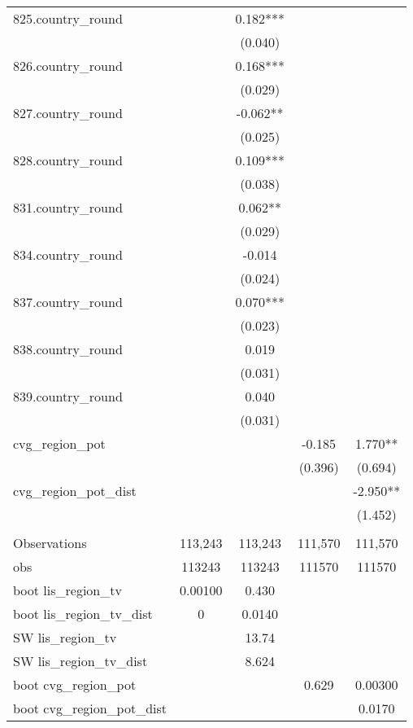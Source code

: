 \documentclass[]{article}
\begin{document}
\begin{tabular}{lcccc}
825.country\_round &  & 0.182*** &  &  \\
 &  & (0.040) &  &  \\
826.country\_round &  & 0.168*** &  &  \\
 &  & (0.029) &  &  \\
827.country\_round &  & -0.062** &  &  \\
 &  & (0.025) &  &  \\
828.country\_round &  & 0.109*** &  &  \\
 &  & (0.038) &  &  \\
831.country\_round &  & 0.062** &  &  \\
 &  & (0.029) &  &  \\
834.country\_round &  & -0.014 &  &  \\
 &  & (0.024) &  &  \\
837.country\_round &  & 0.070*** &  &  \\
 &  & (0.023) &  &  \\
838.country\_round &  & 0.019 &  &  \\
 &  & (0.031) &  &  \\
839.country\_round &  & 0.040 &  &  \\
 &  & (0.031) &  &  \\
cvg\_region\_pot &  &  & -0.185 & 1.770** \\
 &  &  & (0.396) & (0.694) \\
cvg\_region\_pot\_dist &  &  &  & -2.950** \\
 &  &  &  & (1.452) \\
 &  &  &  &  \\
Observations & 113,243 & 113,243 & 111,570 & 111,570 \\
obs & 113243 & 113243 & 111570 & 111570 \\
boot lis\_region\_tv & 0.00100 & 0.430 &  &  \\
boot lis\_region\_tv\_dist & 0 & 0.0140 &  &  \\
SW lis\_region\_tv &  & 13.74 &  &  \\
SW lis\_region\_tv\_dist &  & 8.624 &  &  \\
boot cvg\_region\_pot &  &  & 0.629 & 0.00300 \\
 boot cvg\_region\_pot\_dist &  &  &  & 0.0170 \\ \hline
\end{tabular}
\end{document}
